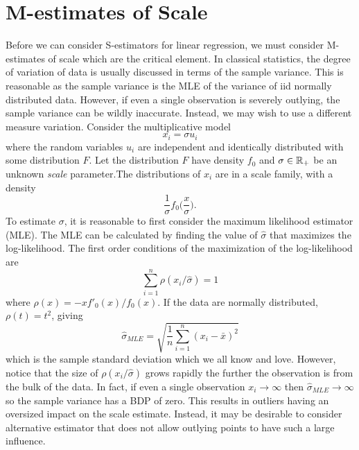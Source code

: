 
\section{M-estimates of Scale}
\label{sec:mScale}
Before we can consider S-estimators for linear regression, we must consider M-estimates of scale which are the critical element. In classical statistics, the degree of variation of data is usually discussed in terms of the sample variance. This is reasonable as the sample variance is the MLE of the variance of iid normally distributed data. However, if even a single observation is severely outlying, the sample variance can be wildly inaccurate. Instead, we may wish to use a different measure variation. Consider the multiplicative model
\begin{equation}
    x_i = \sigma u_i
\end{equation}
where the random variables $u_i$ are independent and identically distributed with some distribution $F$. Let the distribution $F$ have density $f_0$ and $\sigma \in \mathbb{R}_+$ be an unknown \textit{scale} parameter.The distributions of $x_i$ are in a scale family, with a density
$$ \frac{1}{\sigma} f_0\bigg(\frac{x}{\sigma} \bigg).$$
To estimate $\sigma$, it is reasonable to first consider the maximum likelihood estimator (MLE). The MLE can be calculated by finding the value of $\hat \sigma$ that maximizes the log-likelihood. The first order conditions of the maximization of the log-likelihood are
\begin{equation}
    \label{eq:mleScale}
    \sum_{i=1}^n \rho(x_i/\hat \sigma) = 1
\end{equation}
where $\rho(x) = -xf'_0(x)/f_0(x)$. If the data are normally distributed, $\rho(t) = t^2$, giving
\begin{equation}
    \hat \sigma_{MLE} = \sqrt{\frac{1}{n} \sum_{i=1}^n (x_i - \bar x)^2}
\end{equation}
which is the sample standard deviation which we all know and love. However, notice that the size of $\rho(x_i/\hat \sigma)$ grows rapidly the further the observation is from the bulk of the data. In fact, if even a single observation $x_i \xrightarrow{} \infty$ then $\hat\sigma_{MLE} \xrightarrow{} \infty$ so the sample variance has a BDP of zero. This results in outliers having an oversized impact on the scale estimate. Instead, it may be desirable to consider alternative estimator that does not allow outlying points to have such a large influence. 

